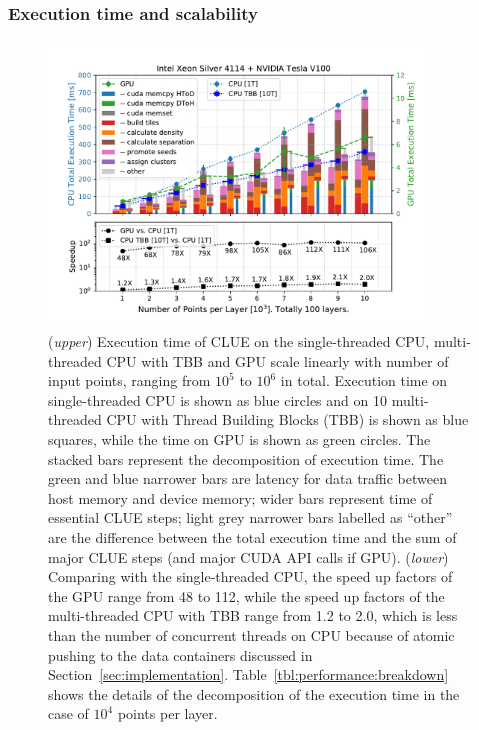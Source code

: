\subsubsection{Execution time and scalability}
\label{sec:performance:executionTime}

\begin{figure}[ht!]
    \centering
    \includegraphics[width=0.9\textwidth]{chapters/HGCal/figures/clue/Figure5_patatrack02_1.pdf}
    \caption{ (\emph{upper}) Execution time of CLUE on the single-threaded CPU, multi-threaded CPU with TBB and GPU scale linearly with number of input points, ranging from $10^5$ to $10^6$ in total. Execution time on single-threaded CPU is shown as blue circles and on 10 multi-threaded CPU with Thread Building Blocks (TBB) is shown as blue squares, while the time on GPU is shown as green circles. The stacked bars represent the decomposition of execution time. The green and blue narrower bars are latency for data traffic between host memory and device memory; wider bars represent time of essential CLUE steps; light grey narrower bars labelled as ``other'' are the difference between the total execution time and the sum of major CLUE steps (and major CUDA API calls if GPU). (\emph{lower}) Comparing with the single-threaded CPU, the speed up factors of the GPU range from 48 to 112,  while the speed up factors of the multi-threaded CPU with TBB range from 1.2 to 2.0, which is less than the number of concurrent threads on CPU because of atomic pushing to the data containers discussed in Section~\ref{sec:implementation}. Table~\ref{tbl:performance:breakdown} shows the details of the decomposition of the execution time in the case of $10^4$ points per layer. }
    \label{fig:performance:executationTime}
\end{figure}

